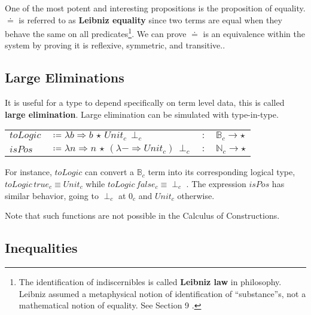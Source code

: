 One of the most potent and interesting propositions is the proposition of equality.
$\doteq$ is referred to as \textbf{Leibniz equality} since two terms are equal when they behave the same on all predicates\footnote{
  The identification of indiscernibles is called \textbf{Leibniz law} in philosophy.
  Leibniz assumed a metaphysical notion of identification of ``substance''s, not a mathematical notion of equality.
  See Section 9 \cite{Leibniz1686}.}.
We can prove $\doteq$ is an equivalence within the system by proving it is reflexive, symmetric, and transitive..

\subsection{Large Eliminations}


It is useful for a type to depend specifically on term level data, this is called \textbf{large elimination}.
Large elimination can be simulated with type-in-type.

\begin{tabular}{llll}
  $toLogic$ & $\coloneqq\lambda b\Rightarrow b\,\star\,Unit_{c}\,\perp_{c}$ & $:$ & $\mathbb{B}_{c}\rightarrow\star$\tabularnewline
  $isPos$ & $\coloneqq\lambda n\Rightarrow n\,\star\,(\lambda-\Rightarrow Unit_{c})\,\perp_{c}$ & $:$ & $\mathbb{N}_{c}\rightarrow\star$\tabularnewline
\end{tabular}
  
For instance, $toLogic$ can convert a $\mathbb{B}_{c}$ term into its corresponding logical type, $toLogic\,true_{c}\equiv Unit_{c}$ while $toLogic\,false_{c}\equiv\perp_{c}$ .
The expression $isPos$ has similar behavior, going to $\perp_{c}$ at $0_{c}$ and $Unit_{c}$ otherwise.

Note that such functions are not possible in the Calculus of Constructions.

\subsection{Inequalities}

